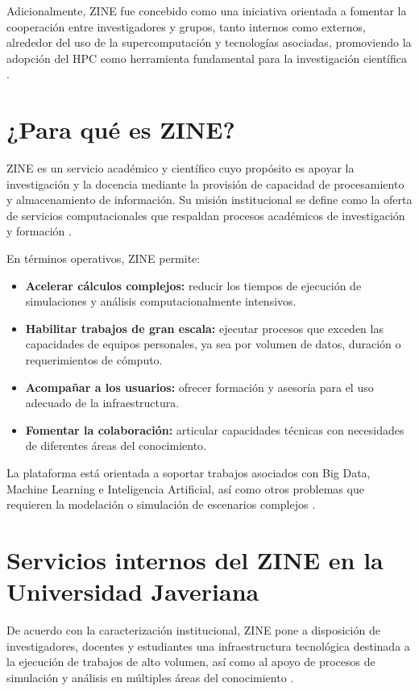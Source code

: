 Adicionalmente, ZINE fue concebido como una iniciativa orientada a fomentar la cooperación entre investigadores y grupos, tanto internos como externos, alrededor del uso de la supercomputación y tecnologías asociadas, promoviendo la adopción del HPC como herramienta fundamental para la investigación científica \cite{zine_oficial}.

\section{¿Para qué es ZINE?}
ZINE es un servicio académico y científico cuyo propósito es apoyar la investigación y la docencia mediante la provisión de capacidad de procesamiento y almacenamiento de información. Su misión institucional se define como la oferta de servicios computacionales que respaldan procesos académicos de investigación y formación \cite{zine_oficial}.

En términos operativos, ZINE permite:
\begin{itemize}
  \item \textbf{Acelerar cálculos complejos:} reducir los tiempos de ejecución de simulaciones y análisis computacionalmente intensivos.
  \item \textbf{Habilitar trabajos de gran escala:} ejecutar procesos que exceden las capacidades de equipos personales, ya sea por volumen de datos, duración o requerimientos de cómputo.
  \item \textbf{Acompañar a los usuarios:} ofrecer formación y asesoría para el uso adecuado de la infraestructura.
  \item \textbf{Fomentar la colaboración:} articular capacidades técnicas con necesidades de diferentes áreas del conocimiento.
\end{itemize}

La plataforma está orientada a soportar trabajos asociados con Big Data, Machine Learning e Inteligencia Artificial, así como otros problemas que requieren la modelación o simulación de escenarios complejos \cite{perfiles_capacidades_zine}.

\section{Servicios internos del ZINE en la Universidad Javeriana}
De acuerdo con la caracterización institucional, ZINE pone a disposición de investigadores, docentes y estudiantes una infraestructura tecnológica destinada a la ejecución de trabajos de alto volumen, así como al apoyo de procesos de simulación y análisis en múltiples áreas del conocimiento \cite{perfiles_capacidades_zine}.

